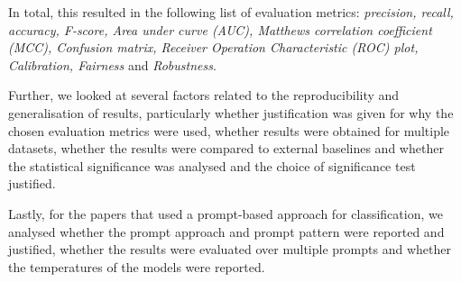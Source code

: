 \documentclass[a4paper]{article}
\begin{document}
In total, this resulted in the following list of evaluation metrics: \textit{precision, recall, accuracy, F-score, Area under curve (AUC), Matthews correlation coefficient (MCC), Confusion matrix, Receiver Operation Characteristic (ROC) plot, Calibration, Fairness} and \textit{Robustness}.

Further, we looked at several factors related to the reproducibility and generalisation of results, particularly whether justification was given for why the chosen evaluation metrics were used, whether results were obtained for multiple datasets, whether the results were compared to external baselines and whether the statistical significance was analysed and the choice of significance test justified. 

Lastly, for the papers that used a prompt-based approach for classification, we analysed whether the prompt approach and prompt pattern were reported and justified, whether the results were evaluated over multiple prompts and whether the temperatures of the models were reported.
\end{document}
